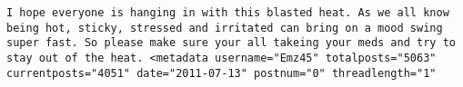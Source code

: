 \begin{verbatim}
I hope everyone is hanging in with this blasted heat. As we all know being hot, sticky, stressed and irritated can bring on a mood swing super fast. So please make sure your all takeing your meds and try to stay out of the heat. <metadata username="Emz45" totalposts="5063" currentposts="4051" date="2011-07-13" postnum="0" threadlength="1"
\end{verbatim}